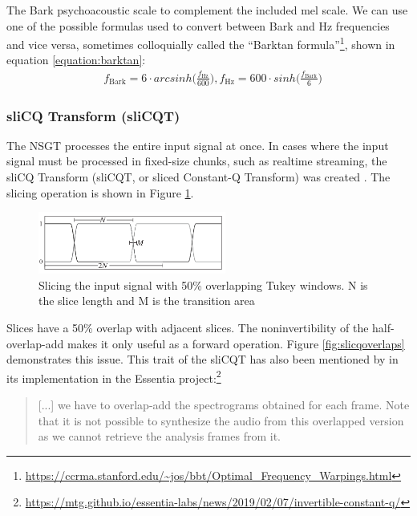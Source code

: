 \documentclass[report.tex]{subfiles}
\begin{document}
The Bark psychoacoustic scale to complement the included mel scale. We can use one of the possible formulas used to convert between Bark and Hz frequencies \parencite{barktan} and vice versa, sometimes colloquially called the ``Barktan formula''\footnote{\url{https://ccrma.stanford.edu/~jos/bbt/Optimal_Frequency_Warpings.html}}, shown in equation \eqref{equation:barktan}:
\begin{align}\tag{26}\label{equation:barktan}
	\nonumber & f_{\text{Bark}} = 6 \cdot arcsinh \Big(\frac{f_{\text{Hz}}}{600}\Big), f_{\text{Hz}} = 600 \cdot sinh \Big(\frac{f_{\text{Bark}}}{6}\Big)
\end{align}

\newpagefill

\subsubsection{sliCQ Transform (sliCQT)}
\label{sec:theoryslicqt}

The NSGT processes the entire input signal at once. In cases where the input signal must be processed in fixed-size chunks, such as realtime streaming, the sliCQ Transform (sliCQT, or sliced Constant-Q Transform) was created \parencite{invertiblecqt, slicq}. The slicing operation is shown in Figure \ref{fig:slicqtukeys}.

\begin{figure}[ht]
	\centering
	\includegraphics[width=0.55\textwidth]{./images-misc/slicq_windows.png}
	\caption{Slicing the input signal with 50\% overlapping Tukey windows. N is the slice length and M is the transition area \parencite{slicq}}
	\label{fig:slicqtukeys}
\end{figure}

Slices have a 50\% overlap with adjacent slices. The noninvertibility of the half-overlap-add makes it only useful as a forward operation. Figure \ref{fig:slicqoverlaps} demonstrates this issue. This trait of the sliCQT has also been mentioned by in its implementation in the Essentia project:\footnote{\url{https://mtg.github.io/essentia-labs/news/2019/02/07/invertible-constant-q/}}

\begin{quote}
	[...] we have to overlap-add the spectrograms obtained for each frame. Note that it is not possible to synthesize the audio from this overlapped version as we cannot retrieve the analysis frames from it.
\end{quote}
\end{document}
